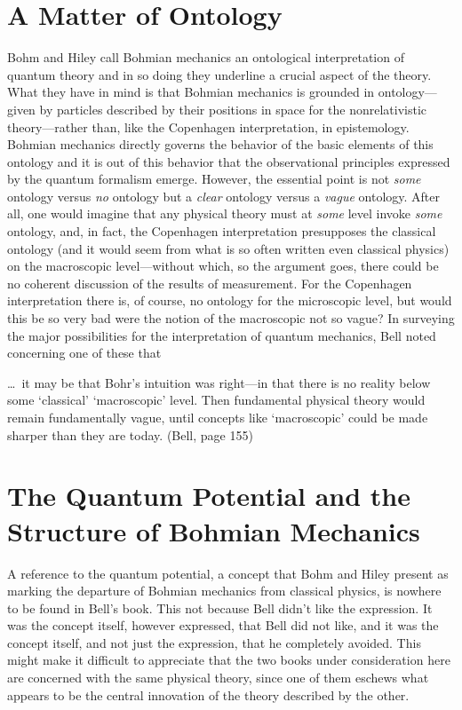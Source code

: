 \section*{A Matter of Ontology}
Bohm and Hiley call Bohmian mechanics an ontological interpretation of
quantum theory and in so doing they underline a crucial aspect of the
theory. What they have in mind is that Bohmian mechanics is grounded in
ontology---given by particles described by their positions in space for the
nonrelativistic theory---rather than, like the Copenhagen interpretation, in
epistemology. Bohmian mechanics directly governs the behavior of the basic
elements of this ontology and it is out of this behavior that the
observational principles expressed by the quantum formalism emerge.
However, the essential point is not {\it some\/} ontology versus {\it no\/}
ontology but a {\it clear\/} ontology versus a {\it vague\/} ontology.
After all, one would imagine that any physical theory must at {\it some\/}
level invoke {\it some\/} ontology, and, in fact, the Copenhagen
interpretation presupposes the classical ontology (and it would seem from
what is so often written even classical physics) on the macroscopic
level---without which, so the argument goes, there could be no coherent
discussion of the results of measurement.  For the Copenhagen
interpretation there is, of course, no ontology for the microscopic level,
but would this be so very bad were the notion of the macroscopic not so
vague? In surveying the major possibilities for the interpretation of
quantum mechanics, Bell noted concerning one of these that

\bq  \noindent \dots\  it may  be that Bohr's intuition was right---in that
there is no reality below some `classical' `macroscopic' level. Then
fundamental physical theory would remain fundamentally vague, until
concepts like `macroscopic' could be made sharper than they are today.
(Bell, page 155)
\eq

\section*{The Quantum Potential and the Structure of Bohmian Mechanics}

A reference to the quantum potential, a concept that Bohm and Hiley present
as marking the departure of Bohmian mechanics from classical physics, is
nowhere to be found in Bell's book. This not because Bell didn't like the
expression. It was the concept itself, however expressed, that Bell did not
like, and it was the concept itself, and not just the expression, that he
completely avoided.  This might make it difficult  to appreciate
that the two books under consideration here are concerned with the same
physical theory, since one of them eschews what appears to be the central
innovation of the theory described by the other.


